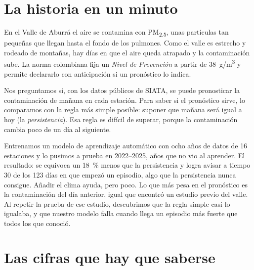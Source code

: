 \documentclass[11pt,a4paper]{article}
\newcommand{\pmd}{PM\textsubscript{2.5}}
\newcommand{\ug}{\textmu g/m\textsuperscript{3}}
\begin{document}
\section{La historia en un minuto}

En el Valle de Aburrá el aire se contamina con \pmd, unas partículas tan pequeñas que llegan
hasta el fondo de los pulmones. Como el valle es estrecho y rodeado de montañas, hay días en
que el aire queda atrapado y la contaminación sube. La norma colombiana fija un \emph{Nivel de
Prevención} a partir de 38~\ug{} y permite declararlo con anticipación si un pronóstico lo
indica.

Nos preguntamos si, con los datos públicos de SIATA, se puede pronosticar la contaminación de
mañana en cada estación. Para saber si el pronóstico sirve, lo comparamos con la regla más
simple posible: suponer que mañana será igual a hoy (la \emph{persistencia}). Esa regla es
difícil de superar, porque la contaminación cambia poco de un día al siguiente.

Entrenamos un modelo de aprendizaje automático con ocho años de datos de 16 estaciones y lo
pusimos a prueba en 2022--2025, años que no vio al aprender. El resultado: se equivoca un 18~\%
menos que la persistencia y logra avisar a tiempo 30 de los 123 días en que empezó un episodio,
algo que la persistencia nunca consigue. Añadir el clima ayuda, pero poco. Lo que más pesa en
el pronóstico es la contaminación del día anterior, igual que encontró un estudio previo del
valle. Al repetir la prueba de ese estudio, descubrimos que la regla simple casi lo igualaba, y
que nuestro modelo falla cuando llega un episodio más fuerte que todos los que conoció.

\section{Las cifras que hay que saberse}
\end{document}
